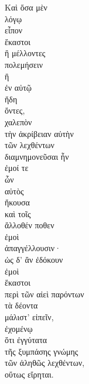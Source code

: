 {\large
\begin{greek}
\noindent Καὶ ὅσα μὲν \\
\tabto{2em} λόγῳ \\
εἶπον \\
ἕκαστοι\\

\tabto{2em} ἢ μέλλοντες \\
\tabto{4em} πολεμήσειν\\
\tabto{2em} ἢ \\
\tabto{4em} ἐν αὐτῷ \\
\tabto{4em} ἤδη \\
\tabto{2em} ὄντες, \\
χαλεπὸν \\
τὴν ἀκρίβειαν αὐτὴν \\
\tabto{2em} τῶν λεχθέντων \\
διαμνημονεῦσαι ἦν \\
\tabto{2em} ἐμοί τε\\
\tabto{4em} ὧν \\
\tabto{4em} αὐτὸς \\
\tabto{4em} ἤκουσα \\
\tabto{2em} καὶ τοῖς \\
\tabto{4em} ἄλλοθέν ποθεν \\
\tabto{4em} ἐμοὶ \\
\tabto{2em} ἀπαγγέλλουσιν· \\
ὡς δ' ἂν ἐδόκουν \\
ἐμοὶ \\
\tabto{2em} ἕκαστοι \\
\tabto{4em} περὶ τῶν αἰεὶ παρόντων \\
\tabto{4em} τὰ δέοντα \\
\tabto{2em} μάλιστ' εἰπεῖν,\\
ἐχομένῳ \\
ὅτι ἐγγύτατα \\
\tabto{2em} τῆς ξυμπάσης γνώμης \\
\tabto{4em} τῶν ἀληθῶς λεχθέντων, \\
οὕτως εἴρηται.\\

\end{greek}
}

